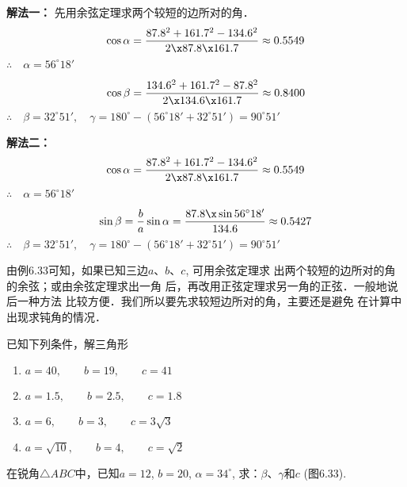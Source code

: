 \begin{solution}
\textbf{解法一：} 先用余弦定理求两个较短的边所对的角．
\[\cos\alpha=\frac{87.8^2+161.7^2-134.6^2}{2\x 87.8\x 161.7}\approx 0.5549\]
$\therefore\quad \alpha=56^{\circ}18'$

\[\cos\beta=\frac{134.6^2+161.7^2-87.8^2}{2\x134.6\x161.7}\approx 0.8400\]
$\therefore\quad \beta=32^{\circ}51',\quad 
\gamma=180^{\circ}-(56^{\circ}18'+32^{\circ}51')=90^{\circ}51'$

\textbf{解法二：} 
\[\cos\alpha=\frac{87.8^2+161.7^2-134.6^2}{2\x 87.8\x 161.7}\approx 0.5549\]
$\therefore\quad \alpha=56^{\circ}18'$
    
\[\sin\beta=\frac{b}{a}\sin\alpha=\frac{87.8\x \sin 56^{\circ}18'}{134.6}\approx 0.5427\]
$\therefore\quad \beta=32^{\circ}51', \quad \gamma=180^{\circ}-(56^{\circ}18'+32^{\circ}51')=90^{\circ}51'$
\end{solution}

由例6.33可知，如果已知三边$a$、$b$、$c$, 可用余弦定理求
出两个较短的边所对的角的余弦；或由余弦定理求出一角
后，再改用正弦定理求另一角的正弦．一般地说后一种方法
比较方便．我们所以要先求较短边所对的角，主要还是避免
在计算中出现求钝角的情况．

\begin{ex}
    已知下列条件，解三角形
\begin{enumerate}
\item $a=40,\qquad b=19,\qquad c=41$
\item $a=1.5,\qquad b=2.5,\qquad c=1.8$
\item $a=6,\qquad b=3,\qquad c=3\sqrt{3}$
\item $a=\sqrt{10},\qquad b=4,\qquad c=\sqrt{2}$   
\end{enumerate}
\end{ex}

\begin{example}
    在锐角$\triangle ABC$中，已知$a=12$, $b=20$, $\alpha=34^{\circ}$, 
    求：$\beta$、$\gamma$和$c$ (图6.33).
\end{example}

\begin{figure}[htp]
    \centering
{}
    \caption{}
\end{figure}


